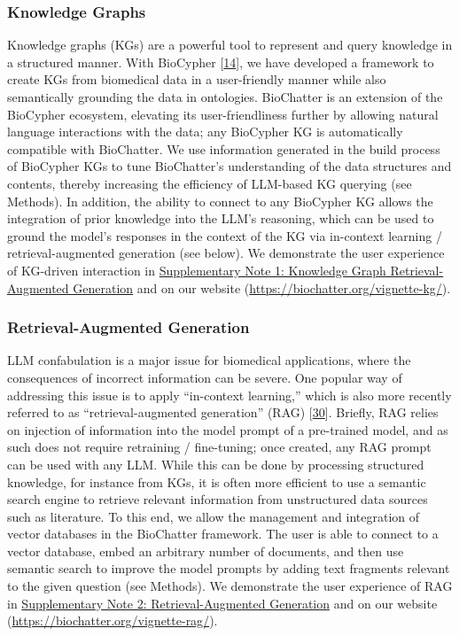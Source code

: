 \hypertarget{knowledge-graphs}{%
\subsubsection{Knowledge Graphs}\label{knowledge-graphs}}

Knowledge graphs (KGs) are a powerful tool to represent and query knowledge in a structured manner.
With BioCypher {[}\protect\hyperlink{ref-tr1XjZ1R}{14}{]}, we have developed a framework to create KGs from biomedical data in a user-friendly manner while also semantically grounding the data in ontologies.
BioChatter is an extension of the BioCypher ecosystem, elevating its user-friendliness further by allowing natural language interactions with the data; any BioCypher KG is automatically compatible with BioChatter.
We use information generated in the build process of BioCypher KGs to tune BioChatter's understanding of the data structures and contents, thereby increasing the efficiency of LLM-based KG querying (see Methods).
In addition, the ability to connect to any BioCypher KG allows the integration of prior knowledge into the LLM's reasoning, which can be used to ground the model's responses in the context of the KG via in-context learning / retrieval-augmented generation (see below).
We demonstrate the user experience of KG-driven interaction in \protect\hyperlink{supplementary-note-1-knowledge-graph-retrieval-augmented-generation}{Supplementary Note 1: Knowledge Graph Retrieval-Augmented Generation} and on our website (\url{https://biochatter.org/vignette-kg/}).

\hypertarget{retrieval-augmented-generation}{%
\subsubsection{Retrieval-Augmented Generation}\label{retrieval-augmented-generation}}

LLM confabulation is a major issue for biomedical applications, where the consequences of incorrect information can be severe.
One popular way of addressing this issue is to apply ``in-context learning,'' which is also more recently referred to as ``retrieval-augmented generation'' (RAG) {[}\protect\hyperlink{ref-1BzQcjRCZ}{30}{]}.
Briefly, RAG relies on injection of information into the model prompt of a pre-trained model, and as such does not require retraining / fine-tuning; once created, any RAG prompt can be used with any LLM.
While this can be done by processing structured knowledge, for instance from KGs, it is often more efficient to use a semantic search engine to retrieve relevant information from unstructured data sources such as literature.
To this end, we allow the management and integration of vector databases in the BioChatter framework.
The user is able to connect to a vector database, embed an arbitrary number of documents, and then use semantic search to improve the model prompts by adding text fragments relevant to the given question (see Methods).
We demonstrate the user experience of RAG in \protect\hyperlink{supplementary-note-2-retrieval-augmented-generation}{Supplementary Note 2: Retrieval-Augmented Generation} and on our website (\url{https://biochatter.org/vignette-rag/}).

